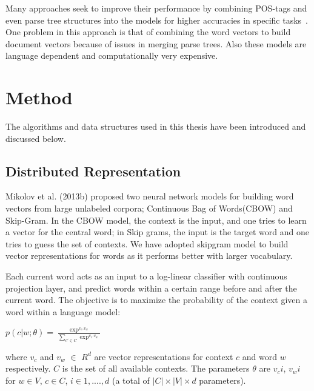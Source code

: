 \documentclass[11pt,a4paper]{article}
\begin{document}
Many approaches seek to improve their performance by combining POS-tags and even parse tree structures into the models for higher accuracies in specific tasks~\cite{Socher:13}. One problem in this approach is that of  combining the word vectors to build document vectors because of issues in merging parse trees. Also these models are language dependent and computationally very expensive.


\section{Method}
The algorithms and data structures used in this thesis have been introduced and discussed below.
\subsection{Distributed Representation}
Mikolov et al. (2013b) proposed two neural network models for building word vectors from large unlabeled corpora; Continuous Bag of Words(CBOW) and Skip-Gram.  In the CBOW model, the context is the input, and one tries to learn a vector for the central word; in Skip grams, the input is the target word and one tries to guess the set of contexts. We have adopted skipgram model to build vector representations for words as it performs better with larger vocabulary.

Each current word acts as an input to a log-linear classifier with continuous projection layer, and predict words within a certain range before and after the current word. The objective is to maximize the probability of the context given a word within a language model:
\begin{center} $p(c|w;\theta)=\frac{\exp^{v_c.v_w}}{\sum_{c' \in C}\exp^{v_c.v_w}}$ \end{center}
where $v_c$ and $v_w$ $\in$ $R^d$ are vector representations for context $c$ and word $w$ respectively. $C$ is the set of all available contexts. The parameters $\theta$ are $v_ci$, $v_wi$ for $w \in V$, $c \in C$, $i \in 1,....,d$ (a total of $|C| \times |V| \times d$ parameters).
\end{document}
